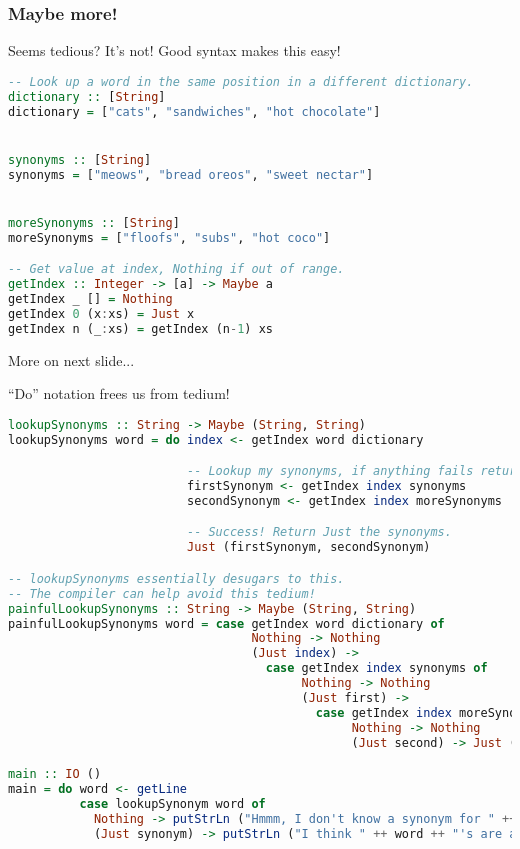 \documentclass{beamer}
\begin{document}
\begin{frame}[fragile]
  \frametitle{Maybe more!}

  Seems tedious? It's not! Good syntax makes this easy!
  \begin{lstlisting}[frame=single, language=Haskell, breaklines=true, basicstyle=\ttfamily\tiny]
-- Look up a word in the same position in a different dictionary.
dictionary :: [String]
dictionary = ["cats", "sandwiches", "hot chocolate"]


synonyms :: [String]
synonyms = ["meows", "bread oreos", "sweet nectar"]


moreSynonyms :: [String]
moreSynonyms = ["floofs", "subs", "hot coco"]

-- Get value at index, Nothing if out of range.
getIndex :: Integer -> [a] -> Maybe a
getIndex _ [] = Nothing
getIndex 0 (x:xs) = Just x
getIndex n (_:xs) = getIndex (n-1) xs
  \end{lstlisting}

  More on next slide...

\end{frame}

\begin{frame}[fragile]
  ``Do'' notation frees us from tedium!

  \begin{lstlisting}[frame=single, language=Haskell, breaklines=true, basicstyle=\ttfamily\tiny]
lookupSynonyms :: String -> Maybe (String, String)
lookupSynonyms word = do index <- getIndex word dictionary

                         -- Lookup my synonyms, if anything fails return Nothing.
                         firstSynonym <- getIndex index synonyms
                         secondSynonym <- getIndex index moreSynonyms

                         -- Success! Return Just the synonyms.
                         Just (firstSynonym, secondSynonym)

-- lookupSynonyms essentially desugars to this.
-- The compiler can help avoid this tedium!
painfulLookupSynonyms :: String -> Maybe (String, String)
painfulLookupSynonyms word = case getIndex word dictionary of
                                  Nothing -> Nothing
                                  (Just index) ->
                                    case getIndex index synonyms of 
                                         Nothing -> Nothing
                                         (Just first) ->
                                           case getIndex index moreSynonyms of
                                                Nothing -> Nothing
                                                (Just second) -> Just (first, second)

main :: IO ()
main = do word <- getLine
          case lookupSynonym word of
            Nothing -> putStrLn ("Hmmm, I don't know a synonym for " ++ word)
            (Just synonym) -> putStrLn ("I think " ++ word ++ "'s are a lot like " ++ synonym ++ "'s!")
  \end{lstlisting}
\end{frame}
\end{document}
